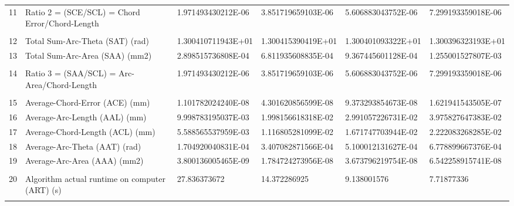 \begin{landscape}
\begin{table}[ht]
{\begin{tabular}{ p{0.2cm} p{8.80cm} p{4.00cm} p{4.0cm} p{4.00cm} p{4.0cm}}
	11	&	Ratio 2 = (SCE/SCL) = Chord Error/Chord-Length	&	1.971493430212E-06	&	3.851719659103E-06	&	5.606883043752E-06	&	7.299193359018E-06	\\
	&		&		&		&		&		\\
	12	&	Total Sum-Arc-Theta (SAT) (rad)	&	1.300410711943E+01	&	1.300415390419E+01	&	1.300401093322E+01	&	1.300396323193E+01	\\
	13	&	Total Sum-Arc-Area (SAA) (mm2)	&	2.898515736808E-04	&	6.811935608835E-04	&	9.367445601128E-04	&	1.255001527807E-03	\\
	&		&		&		&		&		\\
	14	&	Ratio 3 = (SAA/SCL) = Arc-Area/Chord-Length	&	1.971493430212E-06	&	3.851719659103E-06	&	5.606883043752E-06	&	7.299193359018E-06	\\
	&		&		&		&		&		\\
	15	&	Average-Chord-Error (ACE) (mm)	&	1.101782024240E-08	&	4.301620856599E-08	&	9.373293854673E-08	&	1.621941543505E-07	\\
	16	&	Average-Arc-Length (AAL) (mm)	&	9.998783195037E-03	&	1.998156618318E-02	&	2.991057226731E-02	&	3.975827647383E-02	\\
	17	&	Average-Chord-Length (ACL) (mm)	&	5.588565537959E-03	&	1.116805281099E-02	&	1.671747703944E-02	&	2.222083268285E-02	\\
	18	&	Average-Arc-Theta (AAT) (rad)	&	1.704920040831E-04	&	3.407082871566E-04	&	5.100012131627E-04	&	6.778899667376E-04	\\
	19	&	Average-Arc-Area (AAA) (mm2)	&	3.800136005465E-09	&	1.784724273956E-08	&	3.673796219754E-08	&	6.542258915741E-08	\\
	&		&		&		&		&		\\
	20	&	Algorithm actual runtime on computer (ART) (s) 	&	27.836373672	&	14.372286925	&	9.138001576	&	7.71877336	\\
	&		&		&		&		&		\\
	\hline
\end{tabular}

			
}   %
		
\end{table}
\end{landscape}

\clearpage
\pagebreak
